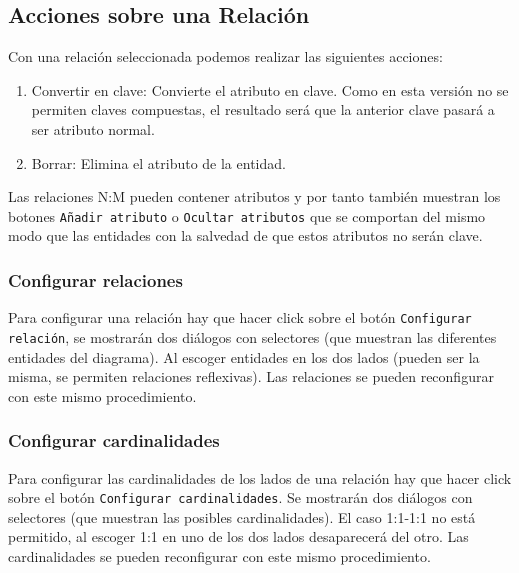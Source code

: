 
\subsection{Acciones sobre una Relación}
Con una relación seleccionada podemos realizar las siguientes acciones:
\begin{enumerate}
    \item Convertir en clave: Convierte el atributo en clave. Como en esta versión no se permiten claves compuestas, el resultado será que la anterior clave pasará a ser atributo normal.
    \item Borrar: Elimina el atributo de la entidad.
\end{enumerate}


Las relaciones N:M pueden contener atributos y por tanto también muestran los botones \texttt{Añadir atributo} o \texttt{Ocultar atributos} que se comportan del mismo modo que las entidades con la salvedad de que estos atributos no serán clave.


\subsubsection{Configurar relaciones}
Para configurar una relación hay que hacer click sobre el botón \texttt{Configurar relación}, se mostrarán dos diálogos con selectores (que muestran las diferentes entidades del diagrama).
Al escoger entidades en los dos lados (pueden ser la misma, se permiten relaciones reflexivas).
Las relaciones se pueden reconfigurar con este mismo procedimiento.


\subsubsection{Configurar cardinalidades}
Para configurar las cardinalidades de los lados de una relación hay que hacer click sobre el botón \texttt{Configurar cardinalidades}. Se mostrarán dos diálogos con selectores (que muestran las posibles cardinalidades).
El caso 1:1-1:1 no está permitido, al escoger 1:1 en uno de los dos lados desaparecerá del otro.
Las cardinalidades se pueden reconfigurar con este mismo procedimiento.

